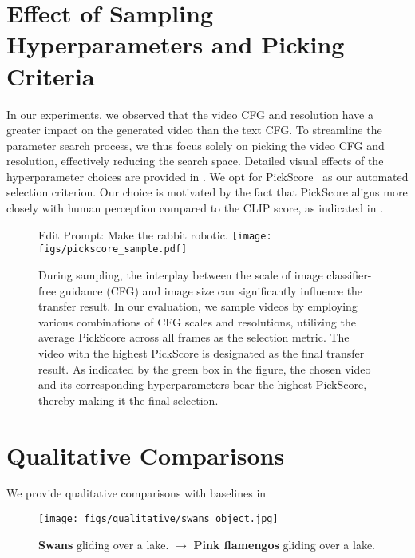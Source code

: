 \section{Effect of Sampling Hyperparameters and Picking Criteria}\label{sec.pick_criteria}
In our experiments, we observed that the video CFG and resolution have a greater impact on the generated video than the text CFG. To streamline the parameter search process, we thus focus solely on picking the video CFG and resolution, effectively reducing the search space. Detailed visual effects of the hyperparameter choices are provided in . We opt for PickScore~\cite{kirstain2023pick} as our automated selection criterion. Our choice is motivated by the fact that PickScore aligns more closely with human perception compared to the CLIP score, as indicated in \cite{kirstain2023pick}.

\begin{figure}
    \centering
    Edit Prompt: Make the rabbit robotic.
    \texttt{[image: figs/pickscore\_sample.pdf]}
    \caption{During sampling, the interplay between the scale of image classifier-free guidance (CFG) and image size can significantly influence the transfer result. In our evaluation, we sample videos by employing various combinations of CFG scales and resolutions, utilizing the average PickScore across all frames as the selection metric. The video with the highest PickScore is designated as the final transfer result. As indicated by the green box in the figure, the chosen video and its corresponding hyperparameters bear the highest PickScore, thereby making it the final selection.}
    \label{fig.pickscore_sample}
\end{figure}

\section{Qualitative Comparisons}\label{sec.qualitative_comparison}
We provide qualitative comparisons with baselines in ~
\begin{figure}
    \centering
    
    \texttt{[image: figs/qualitative/swans\_object.jpg]}
    \caption{\textbf{Swans} gliding over a lake. $\rightarrow$ \textbf{Pink flamengos} gliding over a lake.}\label{fig.additional_qua1}
\end{figure}

